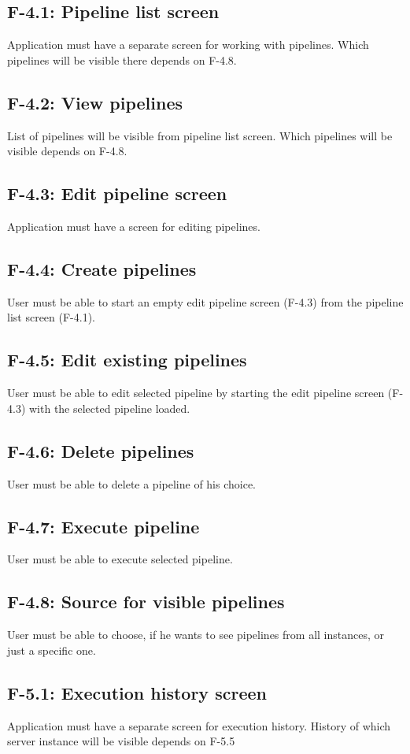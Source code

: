 \subsection*{F-4.1: Pipeline list screen}
Application must have a separate screen for working with pipelines. Which pipelines will be visible there depends on F-4.8.
\subsection*{F-4.2: View pipelines}
List of pipelines will be visible from pipeline list screen. Which pipelines will be visible depends on F-4.8.
\subsection*{F-4.3: Edit pipeline screen}
\label{subsec:editpipelinescreen}
Application must have a screen for editing pipelines.
\subsection*{F-4.4: Create pipelines}
User must be able to start an empty edit pipeline screen (F-4.3) from the pipeline list screen (F-4.1).
\subsection*{F-4.5: Edit existing pipelines}
User must be able to edit selected pipeline by starting the edit pipeline screen (F-4.3) with the selected pipeline loaded.
\subsection*{F-4.6: Delete pipelines}
User must be able to delete a pipeline of his choice.
\subsection*{F-4.7: Execute pipeline}
User must be able to execute selected pipeline.
\subsection*{F-4.8: Source for visible pipelines}
User must be able to choose, if he wants to see pipelines from all instances, or just a specific one.
\subsection*{F-5.1: Execution history screen}
Application must have a separate screen for execution history. History of which server instance will be visible depends on F-5.5
